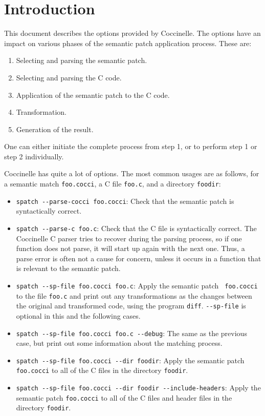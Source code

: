 \section{Introduction}

This document describes the options provided by Coccinelle.  The options
have an impact on various phases of the semantic patch application
process.  These are:

\begin{enumerate}
\item Selecting and parsing the semantic patch.
\item Selecting and parsing the C code.
\item Application of the semantic patch to the C code.
\item Transformation.
\item Generation of the result.
\end{enumerate}

\noindent
One can either initiate the complete process from step 1, or
to perform step 1 or step 2 individually.

Coccinelle has quite a lot of options.  The most common usages are as
follows, for a semantic match {\tt foo.cocci}, a C file {\tt foo.c}, and a
directory {\tt foodir}:

\begin{itemize}
\item {\tt spatch -{}-parse-cocci foo.cocci}: Check that the semantic patch
  is syntactically correct.
\item {\tt spatch -{}-parse-c foo.c}: Check that the C file
  is syntactically correct.  The Coccinelle C parser tries to recover
  during the parsing process, so if one function does not parse, it will
  start up again with the next one.  Thus, a parse error is often not a
  cause for concern, unless it occurs in a function that is relevant to the
  semantic patch.
\item {\tt spatch -{}-sp-file foo.cocci foo.c}: Apply the semantic patch {\tt
    foo.cocci} to the file {\tt foo.c} and print out any transformations as
  the changes between the original and transformed code, using the program
  {\tt diff}.  {\tt -{}-sp-file} is optional in this and the following cases.
\item {\tt spatch -{}-sp-file foo.cocci foo.c -{}-debug}:  The same as the
  previous case, but print out some information about the matching process.
\item {\tt spatch -{}-sp-file foo.cocci -{}-dir foodir}:  Apply the semantic
  patch {\tt foo.cocci} to all of the C files in the directory {\tt foodir}.
\item {\tt spatch -{}-sp-file foo.cocci -{}-dir foodir -{}-include-headers}:  Apply
  the semantic patch {\tt foo.cocci} to all of the C files and header files
  in the directory {\tt foodir}. 
\end{itemize}

